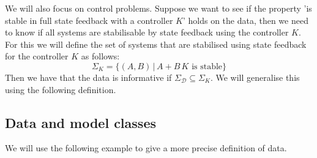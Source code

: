 We will also focus on control problems. Suppose we want to see if the property 'is stable in full state feedback with a controller $K$' holds on the data, then we need to know if all systems are stabilisable by state feedback using the controller $K$. For this we will define the set of systems that are stabilised using state feedback for the controller $K$ as follows:
\[ \Sigma_K = \{ (A,B) \, | \, A + B \, K \mbox{ is stable} \} \]
Then we have that the data is informative if $\Sigma_\mathcal{D} \subseteq \Sigma_K$. We will generalise this using the following definition.



\subsection{Data and model classes}
We will use the following example \cite[Ex 2]{waarde2019data} to give a more precise definition of data.


